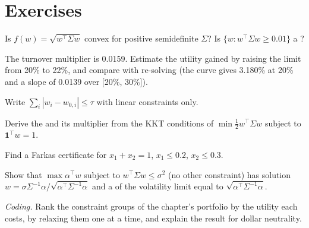 \section{Exercises}

\begin{exercise}[$\star$]\label{exo:qm:convex-optimisation:1}
Is $f(w) = \sqrt{w^\top\Sigma w}$ convex for positive semidefinite $\Sigma$? Is $\{w: w^\top\Sigma w \ge 0.01\}$ a ?
\end{exercise}

\begin{exercise}[$\star$]\label{exo:qm:convex-optimisation:2}
The turnover multiplier is 0.0159. Estimate the utility gained by raising the limit from 20\% to 22\%, and compare with re-solving (the curve gives 3.180\% at 20\% and a slope of 0.0139 over
[20\%, 30\%]).
\end{exercise}

\begin{exercise}[$\star$]\label{exo:qm:convex-optimisation:3}
Write $\sum_i|w_i - w_{0,i}| \le \tau$ with linear constraints only.
\end{exercise}

\begin{exercise}[$\star\star$]\label{exo:qm:convex-optimisation:4}
Derive the  and its multiplier from the KKT conditions of $\min\frac12w^\top\Sigma w$ subject to $\mathbf 1^\top w = 1$.
\end{exercise}

\begin{exercise}[$\star\star$]\label{exo:qm:convex-optimisation:5}
Find a Farkas certificate for $x_1 + x_2 = 1$, $x_1 \le 0.2$, $x_2 \le 0.3$.
\end{exercise}

\begin{exercise}[$\star\star$]\label{exo:qm:convex-optimisation:6}
Show that $\max\alpha^\top w$ subject to $w^\top\Sigma w \le \sigma^2$ (no other constraint) has solution $w = \sigma\Sigma^{-1}\alpha/\sqrt{\alpha^\top\Sigma^{-1}\alpha}$ and a  of the
volatility limit equal to $\sqrt{\alpha^\top\Sigma^{-1}\alpha}$.
\end{exercise}

\begin{exercise}[$\star\star\star$]\label{exo:qm:convex-optimisation:7}
\emph{Coding.} Rank the constraint groups of the chapter's portfolio by the utility each costs, by relaxing them one at a time, and explain the result for dollar neutrality.
\end{exercise}

